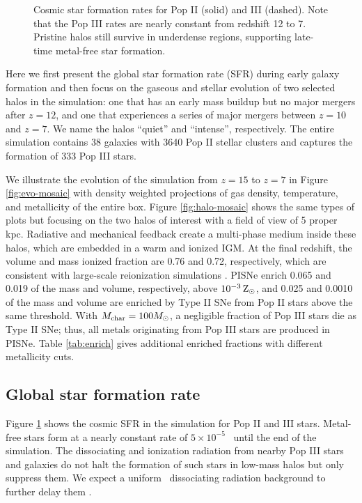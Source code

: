 \documentclass[apjl]{emulateapj}
\begin{document}
\begin{figure}
\caption{\label{fig:sfr} Cosmic star formation rates for Pop II
  (solid) and III (dashed).  Note that the Pop III rates are nearly
  constant from redshift 12 to 7.  Pristine halos still survive in
  underdense regions, supporting late-time metal-free star formation.}
\end{figure}


Here we first present the global star formation rate (SFR) during
early galaxy formation and then focus on the gaseous and stellar
evolution of two selected halos in the simulation: one that has an
early mass buildup but no major mergers after $z=12$, and one that
experiences a series of major mergers between $z=10$ and $z=7$.  We
name the halos ``quiet'' and ``intense'', respectively.  The entire
simulation contains 38 galaxies with 3640 Pop II stellar clusters and
captures the formation of 333 Pop III stars.

We illustrate the evolution of the simulation from $z=15$ to $z=7$ in
Figure \ref{fig:evo-mosaic} with density weighted projections of gas
density, temperature, and metallicity of the entire box.  Figure
\ref{fig:halo-mosaic} shows the same types of plots but focusing on
the two halos of interest with a field of view of 5 proper kpc.
Radiative and mechanical feedback create a multi-phase medium inside
these halos, which are embedded in a warm and ionized IGM.  At the
final redshift, the volume and mass ionized fraction are 0.76 and
0.72, respectively, which are consistent with large-scale reionization
simulations \citep{Zahn11}.  PISNe enrich 0.065 and 0.019 of the mass
and volume, respectively, above $10^{-3} {\rm\,Z_\odot}$, and 0.025 and 0.0010
of the mass and volume are enriched by Type II SNe from Pop II stars
above the same threshold.  With $M_{\rm char} = 100 \Ms$, a negligible
fraction of Pop III stars die as Type II SNe; thus, all metals
originating from Pop III stars are produced in PISNe.  Table
\ref{tab:enrich} gives additional enriched fractions with different
metallicity cuts.

\subsection{Global star formation rate}

Figure \ref{fig:sfr} shows the cosmic SFR in the simulation for Pop II
and III stars.  Metal-free stars form at a nearly constant rate of $5
\times 10^{-5}$ \sfr~until the end of the simulation.  The
dissociating and ionization radiation from nearby Pop III stars and
galaxies do not halt the formation of such stars in low-mass halos
but only suppress them.  We expect a uniform \hh~dissociating
radiation background to further delay them \citep{Machacek01, Wise07,
  OShea08}.
\end{document}
